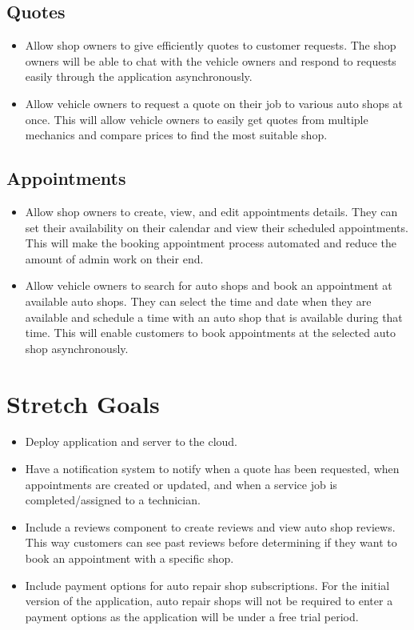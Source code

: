 \documentclass{article}
\begin{document}
\subsection{Quotes}
\begin{itemize}
    \item Allow shop owners to give efficiently quotes to customer requests. The shop owners will be able to 
    chat with the vehicle owners and respond to requests easily through the application asynchronously.
    \item Allow vehicle owners to request a quote on their job to various auto shops at once. This will 
    allow vehicle owners to easily get quotes from multiple mechanics and compare prices to find the most suitable shop.
\end{itemize}

\subsection{Appointments}
\begin{itemize}
    \item Allow shop owners to create, view, and edit appointments details. They can set their availability on 
    their calendar and view their scheduled appointments. This will make the booking appointment process 
    automated and reduce the amount of admin work on their end.
    \item Allow vehicle owners to search for auto shops and book an appointment at available auto shops. 
    They can select the time and date when they are available and schedule a time with an auto shop that 
    is available during that time. This will enable customers to book appointments at the selected auto shop asynchronously.
\end{itemize}

\section{Stretch Goals}
\begin{itemize}
    \item Deploy application and server to the cloud.
    \item Have a notification system to notify when a quote has been requested, when appointments 
    are created or updated, and when a service job is completed/assigned to a technician.
    \item Include a reviews component to create reviews and view auto shop reviews. This 
    way customers can see past reviews before determining if they want to book an appointment with a specific shop.
    \item Include payment options for auto repair shop subscriptions. For the initial version of the application,
    auto repair shops will not be required to enter a payment options as the application will be under a free trial period.
\end{itemize}
\end{document}
